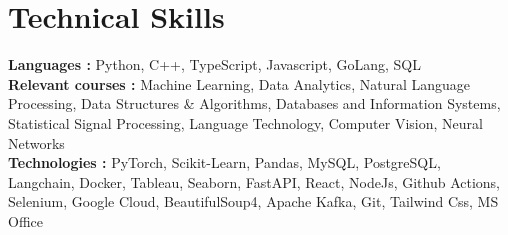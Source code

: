 \section{Technical Skills}
 \begin{itemize}[leftmargin=0.0in, label={}]
    \small{\item{
     \textbf{\normalsize{Languages :}}{ \normalsize{Python, C++, TypeScript, Javascript, GoLang, SQL}} \\
     \vspace{4pt}
     \textbf{\normalsize{Relevant courses :}}{\normalsize{ Machine Learning, Data Analytics, Natural Language Processing, Data Structures \& Algorithms, Databases and Information Systems, Statistical Signal Processing, Language Technology, Computer Vision, Neural Networks}} \\
     \vspace{4pt}
     \textbf{\normalsize{Technologies :}}{\normalsize{ PyTorch, Scikit-Learn, Pandas, MySQL, PostgreSQL, Langchain, Docker, Tableau, Seaborn, FastAPI, React, NodeJs, Github Actions, Selenium, Google Cloud, BeautifulSoup4, Apache Kafka, Git, Tailwind Css, MS Office}} 
    }}
    
 \end{itemize}